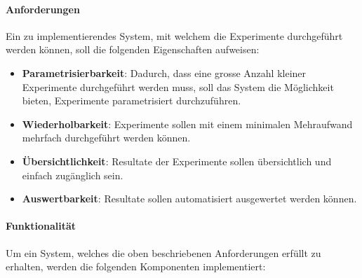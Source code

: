 \paragraph{Anforderungen}
\label{technical_setup:requirements}
Ein zu implementierendes System, mit welchem die Experimente durchgeführt werden können, soll die folgenden Eigenschaften aufweisen:

\begin{itemize}
	\item \textbf{Parametrisierbarkeit}: Dadurch, dass eine grosse Anzahl kleiner Experimente durchgeführt werden muss, soll das System die Möglichkeit bieten, Experimente parametrisiert durchzuführen.
	\item \textbf{Wiederholbarkeit}: Experimente sollen mit einem minimalen Mehraufwand mehrfach durchgeführt werden können.  
	\item \textbf{Übersichtlichkeit}: Resultate der Experimente sollen übersichtlich und einfach zugänglich sein.
	\item \textbf{Auswertbarkeit}: Resultate sollen automatisiert ausgewertet werden können.
\end{itemize}

\paragraph{Funktionalität}
\label{technical_setup:functionality}
Um ein System, welches die oben beschriebenen Anforderungen erfüllt zu erhalten, werden die folgenden Komponenten implementiert:

